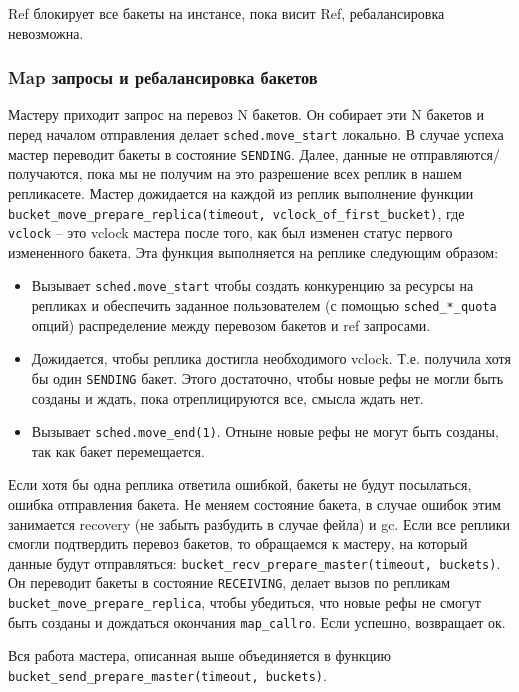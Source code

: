 Ref блокирует все бакеты на инстансе, пока висит Ref, ребалансировка
невозможна.

\subsubsection{Map запросы и ребалансировка бакетов}

Мастеру приходит запрос на перевоз N бакетов. Он собирает эти N бакетов и перед
началом отправления делает \texttt{sched.move\_start} локально. В случае успеха
мастер переводит бакеты в состояние \texttt{SENDING}. Далее, данные не
отправляются/получаются, пока мы не получим на это разрешение всех реплик в
нашем репликасете. Мастер дожидается на каждой из реплик выполнение функции
\texttt{bucket\_move\_prepare\_replica(timeout, vclock\_of\_first\_bucket)}, где
\texttt{vclock} -- это vclock мастера после того, как был изменен статус
первого измененного бакета. Эта функция выполняется на реплике следующим
образом:

\begin{itemize}
\item Вызывает \texttt{sched.move\_start} чтобы создать конкуренцию за ресурсы
    на репликах и обеспечить заданное пользователем (с помощью
        \texttt{sched\_*\_quota} опций) распределение между перевозом бакетов и
        ref запросами.
\item Дожидается, чтобы реплика достигла необходимого vclock. Т.е. получила
    хотя бы один \texttt{SENDING} бакет. Этого достаточно, чтобы новые рефы не
        могли быть созданы и ждать, пока отреплицируются все, смысла ждать нет.
\item Вызывает \texttt{sched.move\_end(1)}. Отныне новые рефы не могут быть
    созданы, так как бакет перемещается.
\end{itemize}

Если хотя бы одна реплика ответила ошибкой, бакеты не будут посылаться, ошибка
отправления бакета. Не меняем состояние бакета, в случае ошибок этим занимается
recovery (не забыть разбудить в случае фейла) и gc. Если все реплики смогли
подтвердить перевоз бакетов, то обращаемся к мастеру, на который данные будут
отправляться: \texttt{bucket\_recv\_prepare\_master(timeout, buckets)}. Он
переводит бакеты в состояние \texttt{RECEIVING}, делает вызов по репликам
\texttt{bucket\_move\_prepare\_replica}, чтобы убедиться, что новые рефы не смогут
быть созданы и дождаться окончания \texttt{map\_callro}. Если успешно,
возвращает ок.

Вся работа мастера, описанная выше объединяется в функцию
\texttt{bucket\_send\_prepare\_master(timeout, buckets)}.

